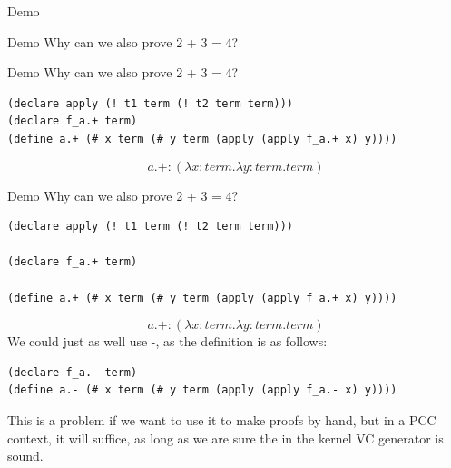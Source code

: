 \documentclass[10pt,t]{beamer}
\begin{document}
\begin{frame}{Demo}

\end{frame}

\begin{frame}{Demo}
  Why can we also prove 2 + 3 = 4?
\end{frame}

\begin{frame}[containsverbatim]{Demo}
  Why can we also prove 2 + 3 = 4?
\begin{lstlisting}
(declare apply (! t1 term (! t2 term term)))
(declare f_a.+ term)
(define a.+ (# x term (# y term (apply (apply f_a.+ x) y))))
\end{lstlisting}
  $$a.+ : (\lambda x : term . \lambda y : term . term)$$
\end{frame}

\begin{frame}[containsverbatim]{Demo}
  Why can we also prove 2 + 3 = 4?
\begin{lstlisting}
(declare apply (! t1 term (! t2 term term)))

(declare f_a.+ term)

(define a.+ (# x term (# y term (apply (apply f_a.+ x) y))))
\end{lstlisting}
$$a.+ : (\lambda x : term . \lambda y : term . term)$$
We could just as well use -, as the definition is as follows:
\begin{lstlisting}
(declare f_a.- term)
(define a.- (# x term (# y term (apply (apply f_a.- x) y))))
\end{lstlisting}
This is a problem if we want to use it to make proofs by hand,
but in a PCC context, it will suffice, as long as we are sure the
in the kernel VC generator is sound.
\end{frame}
\end{document}

